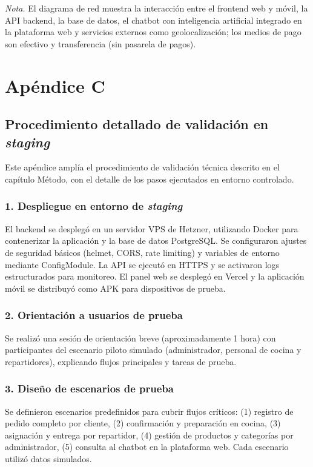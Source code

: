 \textit{Nota.} El diagrama de red muestra la interacción entre el frontend web y móvil, la API backend, la base de datos, el chatbot con inteligencia artificial integrado en la plataforma web y servicios externos como geolocalización; los medios de pago son efectivo y transferencia (sin pasarela de pagos).

\chapter{Apéndice C}\label{ap:C}

\section*{Procedimiento detallado de validación en \textit{staging}}
Este apéndice amplía el procedimiento de validación técnica descrito en el capítulo Método, con el detalle de los pasos ejecutados en entorno controlado.

\subsection*{1. Despliegue en entorno de \textit{staging}}
El backend se desplegó en un servidor VPS de Hetzner, utilizando Docker para contenerizar la aplicación y la base de datos PostgreSQL. Se configuraron ajustes de seguridad básicos (helmet, CORS, rate limiting) y variables de entorno mediante ConfigModule. La API se ejecutó en HTTPS y se activaron logs estructurados para monitoreo. El panel web se desplegó en Vercel y la aplicación móvil se distribuyó como APK para dispositivos de prueba.

\subsection*{2. Orientación a usuarios de prueba}
Se realizó una sesión de orientación breve (aproximadamente 1 hora) con participantes del escenario piloto simulado (administrador, personal de cocina y repartidores), explicando flujos principales y tareas de prueba.

\subsection*{3. Diseño de escenarios de prueba}
Se definieron escenarios predefinidos para cubrir flujos críticos: (1) registro de pedido completo por cliente, (2) confirmación y preparación en cocina, (3) asignación y entrega por repartidor, (4) gestión de productos y categorías por administrador, (5) consulta al chatbot en la plataforma web. Cada escenario utilizó datos simulados.

